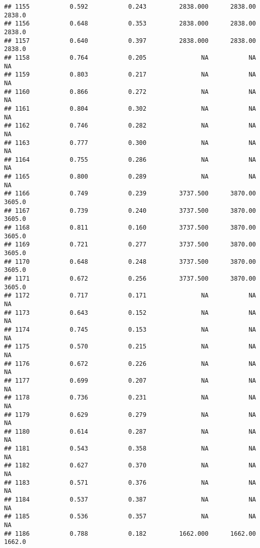 \documentclass[
]{article}
\begin{document}
\begin{verbatim}
## 1155           0.592           0.243         2838.000      2838.00       2838.0
## 1156           0.648           0.353         2838.000      2838.00       2838.0
## 1157           0.640           0.397         2838.000      2838.00       2838.0
## 1158           0.764           0.205               NA           NA           NA
## 1159           0.803           0.217               NA           NA           NA
## 1160           0.866           0.272               NA           NA           NA
## 1161           0.804           0.302               NA           NA           NA
## 1162           0.746           0.282               NA           NA           NA
## 1163           0.777           0.300               NA           NA           NA
## 1164           0.755           0.286               NA           NA           NA
## 1165           0.800           0.289               NA           NA           NA
## 1166           0.749           0.239         3737.500      3870.00       3605.0
## 1167           0.739           0.240         3737.500      3870.00       3605.0
## 1168           0.811           0.160         3737.500      3870.00       3605.0
## 1169           0.721           0.277         3737.500      3870.00       3605.0
## 1170           0.648           0.248         3737.500      3870.00       3605.0
## 1171           0.672           0.256         3737.500      3870.00       3605.0
## 1172           0.717           0.171               NA           NA           NA
## 1173           0.643           0.152               NA           NA           NA
## 1174           0.745           0.153               NA           NA           NA
## 1175           0.570           0.215               NA           NA           NA
## 1176           0.672           0.226               NA           NA           NA
## 1177           0.699           0.207               NA           NA           NA
## 1178           0.736           0.231               NA           NA           NA
## 1179           0.629           0.279               NA           NA           NA
## 1180           0.614           0.287               NA           NA           NA
## 1181           0.543           0.358               NA           NA           NA
## 1182           0.627           0.370               NA           NA           NA
## 1183           0.571           0.376               NA           NA           NA
## 1184           0.537           0.387               NA           NA           NA
## 1185           0.536           0.357               NA           NA           NA
## 1186           0.788           0.182         1662.000      1662.00       1662.0

\end{verbatim}
\end{document}
